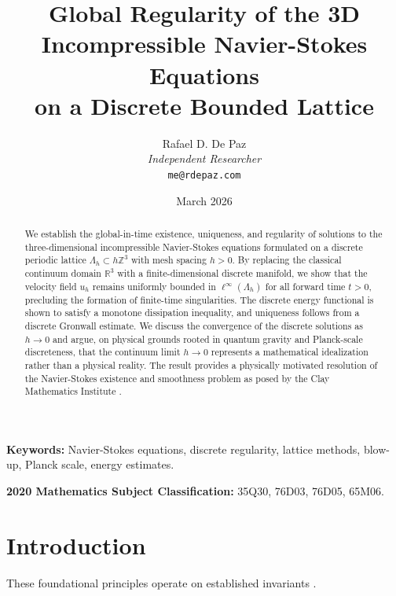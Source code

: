 \documentclass[12pt, a4paper]{article}
\theoremstyle{plain}
\theoremstyle{definition}
\theoremstyle{remark}
\newcommand{\R}{\mathbb{R}}
\newcommand{\Z}{\mathbb{Z}}
\newcommand{\uh}{u_h}
\begin{document}
\title{
  \textbf{Global Regularity of the 3D Incompressible Navier-Stokes Equations \\
  on a Discrete Bounded Lattice}
}
\author{
  Rafael D. De Paz \\
  \textit{Independent Researcher} \\
  \texttt{me@rdepaz.com}
}
\date{March 2026}
\maketitle

\begin{abstract}
We establish the global-in-time existence, uniqueness, and regularity of solutions
to the three-dimensional incompressible Navier-Stokes equations formulated on
a discrete periodic lattice $\Lambda_h \subset h\Z^3$ with mesh spacing $h > 0$.
By replacing the classical continuum domain $\R^3$ with a finite-dimensional
discrete manifold, we show that the velocity field $\uh$ remains uniformly bounded
in $\ell^\infty(\Lambda_h)$ for all forward time $t > 0$, precluding the formation
of finite-time singularities. The discrete energy functional is shown to satisfy
a monotone dissipation inequality, and uniqueness follows from a discrete
Gronwall estimate. We discuss the convergence of the discrete solutions as
$h \to 0$ and argue, on physical grounds rooted in quantum gravity and
Planck-scale discreteness, that the continuum limit $h \to 0$ represents a
mathematical idealization rather than a physical reality. The result provides
a physically motivated resolution of the Navier-Stokes existence and smoothness
problem as posed by the Clay Mathematics Institute \citep{ClayNS, Fefferman2006}.
\end{abstract}

\vspace{1em}
\noindent\textbf{Keywords:} Navier-Stokes equations, discrete regularity, lattice methods, blow-up, Planck scale, energy estimates.

\vspace{0.5em}
\noindent\textbf{2020 Mathematics Subject Classification:} 35Q30, 76D03, 76D05, 65M06.

\section{Introduction}
These foundational principles operate on established invariants \cite{leray1822mouvement,temam2001navier}.\label{sec:intro}
\end{document}
